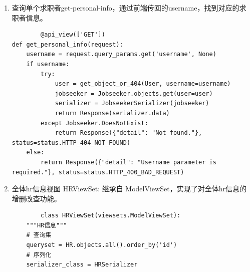 \documentclass[UTF8,a4paper,10pt]{ctexart}
\begin{document}
\begin{enumerate}
    \item 查询单个求职者get-personal-info，通过前端传回的username，找到对应的求职者信息。
    \begin{lstlisting}
        @api_view(['GET'])
def get_personal_info(request):
    username = request.query_params.get('username', None)
    if username:
        try:
            user = get_object_or_404(User, username=username)
            jobseeker = Jobseeker.objects.get(user=user)
            serializer = JobseekerSerializer(jobseeker)
            return Response(serializer.data)
        except Jobseeker.DoesNotExist:
            return Response({"detail": "Not found."}, status=status.HTTP_404_NOT_FOUND)
    else:
        return Response({"detail": "Username parameter is required."}, status=status.HTTP_400_BAD_REQUEST)
    \end{lstlisting}
    \item 全体hr信息视图 HRViewSet: 继承自 ModelViewSet，实现了对全体hr信息的增删改查功能。
    \begin{lstlisting}
        class HRViewSet(viewsets.ModelViewSet):
    """HR信息"""
    # 查询集
    queryset = HR.objects.all().order_by('id')
    # 序列化
    serializer_class = HRSerializer
    \end{lstlisting}
\end{enumerate}
\end{document}
